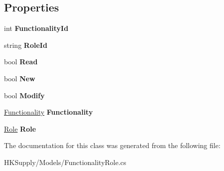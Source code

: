 \subsection*{Properties}
\begin{DoxyCompactItemize}
\item 
\mbox{\label{class_h_k_supply_1_1_models_1_1_functionality_role_a0ded12aa8bec42c6b7bb6097c74c35e7}} 
int {\bfseries Functionality\+Id}
\item 
\mbox{\label{class_h_k_supply_1_1_models_1_1_functionality_role_a765b8678a9661752e6f2899d98e661d4}} 
string {\bfseries Role\+Id}
\item 
\mbox{\label{class_h_k_supply_1_1_models_1_1_functionality_role_aed71c97ac0caf396dc15a24c45d56fab}} 
bool {\bfseries Read}
\item 
\mbox{\label{class_h_k_supply_1_1_models_1_1_functionality_role_a6faad04d06f87ef7121acb504c3c6759}} 
bool {\bfseries New}
\item 
\mbox{\label{class_h_k_supply_1_1_models_1_1_functionality_role_a26b7d361ba1ab93b2f393b1b99e5fc39}} 
bool {\bfseries Modify}
\item 
\mbox{\label{class_h_k_supply_1_1_models_1_1_functionality_role_ae6697fdcf6d2cdcbcf86736b5abbc3ae}} 
\hyperlink{class_h_k_supply_1_1_models_1_1_functionality}{Functionality} {\bfseries Functionality}
\item 
\mbox{\label{class_h_k_supply_1_1_models_1_1_functionality_role_a94917c7d388484877ef08df62449f747}} 
\hyperlink{class_h_k_supply_1_1_models_1_1_role}{Role} {\bfseries Role}
\end{DoxyCompactItemize}


The documentation for this class was generated from the following file\+:\begin{DoxyCompactItemize}
\item 
H\+K\+Supply/\+Models/Functionality\+Role.\+cs\end{DoxyCompactItemize}
